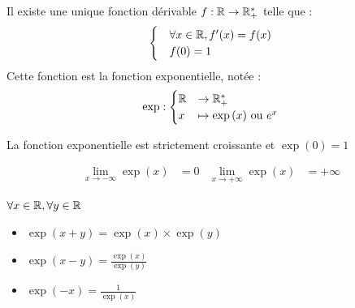 \begin{graybox}
	\begin{theoreme}[]
		Il existe une unique fonction dérivable $f:\mathbb{R} \to \mathbb{R}_+^*$ telle que :
		\begin{align*}
			\begin{cases}
				&\forall x \in \mathbb{R}, f'(x) = f(x) \\
				&f(0) = 1
			\end{cases}
		\end{align*}
		Cette fonction est la fonction exponentielle, notée :
		\begin{align*}
			\exp :
			\begin{cases}
				\mathbb{R} &\to \mathbb{R}^*_+ \\
				x &\mapsto \exp{(x)} \text{ ou } e^x     
			\end{cases}
		\end{align*}
	\end{theoreme}
\end{graybox}

\begin{graybox}
	\begin{proposition}
		La fonction exponentielle est strictement croissante et $\exp{(0)} = 1$
	\end{proposition}
\end{graybox}

\begin{graybox}
	\begin{proposition}
		\begin{align*}
			\lim_{x \to -\infty} \exp{(x)} &= 0 & \lim_{x \to +\infty} \exp{(x)} &= +\infty
		\end{align*}
	\end{proposition}
\end{graybox}

\begin{graybox}
	\begin{proposition}
		$\forall x \in \mathbb{R}, \forall y \in \mathbb{R}$
		\begin{itemize}
			\item $\exp{(x+y)} = \exp{(x)} \times \exp{(y)}$
			\item $\exp{(x - y)} = \frac{\exp{(x)}}{\exp{(y)}}$
			\item $\exp{(-x)} = \frac{1}{\exp{(x)}}$
		\end{itemize}    
	\end{proposition}
\end{graybox}

